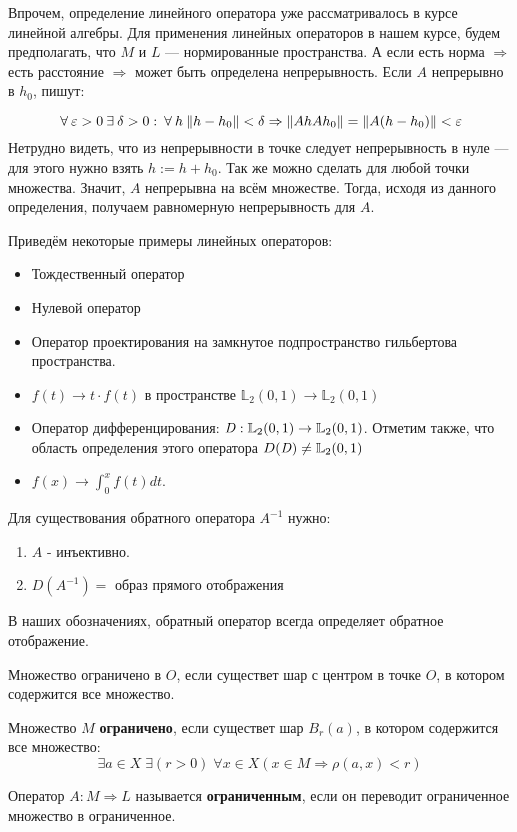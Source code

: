 \documentclass[12pt]{article}
\begin{document}
	Впрочем, определение линейного оператора уже рассматривалось в курсе линейной алгебры. Для применения линейных операторов в
	нашем курсе, будем предполагать, что $M$ и $L$ --- нормированные пространства. А если есть норма $\Rightarrow$ есть расстояние
	$\Rightarrow$ может быть определена непрерывность. Если $A$ непрерывно в $h_0$, пишут:
	
	$$ \forall \varepsilon > 0 \exists \delta > 0 : \forall h \: \norm{h - h_0} < \delta \Rightarrow \norm{Ah  Ah_0} 
	= \norm{A(h-h_0)} < \varepsilon $$
	Нетрудно видеть, что из непрерывности в точке следует непрерывность в нуле --- для этого нужно взять $h := h + h_0$. 
	Так же можно сделать для любой точки множества. Значит, $A$ непрерывна на всём множестве. Тогда, исходя из данного
	определения, получаем равномерную непрерывность для $A$.
	
	Приведём некоторые примеры линейных операторов:
	\begin{itemize}
		\item Тождественный оператор
		\item Нулевой оператор
		\item Оператор проектирования на замкнутое подпространство гильбертова пространства.
		\item $f(t) \rightarrow t \cdot f(t)$ в пространстве $\mathbb{L}_2 (0,1) \rightarrow \mathbb{L}_2 (0,1)$
		\item Оператор дифференцирования: $\text{\emph{D}}: \mathbb{L}_2 (0,1) \rightarrow \mathbb{L}_2 (0,1)$. Отметим также, что
		область определения этого оператора $D(\text{\emph{D}}) \neq \mathbb{L}_2 (0,1)$
		\item $f(x) \rightarrow \int_0^x f(t) dt$.
	\end{itemize}
	
	Для существования обратного оператора $A^{-1}$ нужно:
	\begin{enumerate}
		\item $A$ - инъективно.
		\item $D(A^{-1}) = $ образ прямого отображения
	\end{enumerate}
	В наших обозначениях, обратный оператор всегда определяет обратное отображение.
	
	\begin{defi}
		Множество ограничено в $O$, если существет шар с центром в точке $O$, в котором содержится все множество.
	\end{defi}
	\begin{defi}
		Множество $M$ \textbf{ограничено}, если существет шар $B_r(a)$, в котором содержится все множество:
		$$ \exists a \in X \; \exists (r > 0) \; \forall x \in X (x \in M \Rightarrow \rho(a, x) < r) $$
	\end{defi}
	\begin{defi}
		Оператор $A: M \Rightarrow L$ называется \textbf{ограниченным}, если он переводит ограниченное множество
		в ограниченное.
	\end{defi}
	
\end{document}
